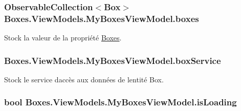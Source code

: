 \subsubsection[{\texorpdfstring{boxes}{boxes}}]{\setlength{\rightskip}{0pt plus 5cm}Observable\+Collection$<${\bf Box}$>$ Boxes.\+View\+Models.\+My\+Boxes\+View\+Model.\+boxes\hspace{0.3cm}{\ttfamily [private]}}\hypertarget{class_boxes_1_1_view_models_1_1_my_boxes_view_model_a72c2f35d46df30a2a514313dbb7c8e7f}{}\label{class_boxes_1_1_view_models_1_1_my_boxes_view_model_a72c2f35d46df30a2a514313dbb7c8e7f}


Stock la valeur de la propriété {\ttfamily \hyperlink{namespace_boxes}{Boxes}}. 

\subsubsection[{\texorpdfstring{box\+Service}{boxService}}]{ Boxes.\+View\+Models.\+My\+Boxes\+View\+Model.\+box\+Service\hspace{0.3cm}{\ttfamily [private]}}\hypertarget{class_boxes_1_1_view_models_1_1_my_boxes_view_model_ab3f024f0941c1630bd3f9cbf0bd6dce4}{}\label{class_boxes_1_1_view_models_1_1_my_boxes_view_model_ab3f024f0941c1630bd3f9cbf0bd6dce4}


Stock le service d\textquotesingle{}accès aux données de l\textquotesingle{}entité Box. 

\subsubsection[{\texorpdfstring{is\+Loading}{isLoading}}]{\setlength{\rightskip}{0pt plus 5cm}bool Boxes.\+View\+Models.\+My\+Boxes\+View\+Model.\+is\+Loading\hspace{0.3cm}{\ttfamily [private]}}\hypertarget{class_boxes_1_1_view_models_1_1_my_boxes_view_model_a3b5e809b4f208c572dc598e14b5f4581}{}\label{class_boxes_1_1_view_models_1_1_my_boxes_view_model_a3b5e809b4f208c572dc598e14b5f4581}


